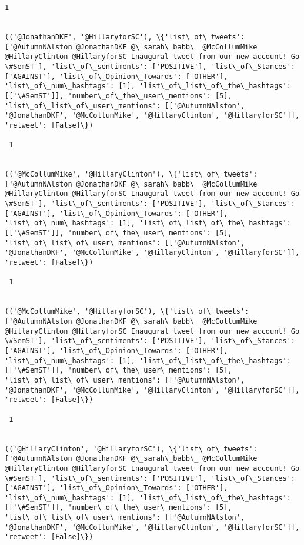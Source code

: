 \documentclass[11pt]{article}
\begin{document}
\begin{Verbatim}[commandchars=\\\{\}]
 1
 

(('@JonathanDKF', '@HillaryforSC'), \{'list\_of\_tweets': ['@AutumnNAlston @JonathanDKF @\_sarah\_babb\_ @McCollumMike @HillaryClinton @HillaryforSC Inaugural tweet from our new account! Go \#SemST'], 'list\_of\_sentiments': ['POSITIVE'], 'list\_of\_Stances': ['AGAINST'], 'list\_of\_Opinion\_Towards': ['OTHER'], 'list\_of\_num\_hashtags': [1], 'list\_of\_list\_of\_the\_hashtags': [['\#SemST']], 'number\_of\_the\_user\_mentions': [5], 'list\_of\_list\_of\_user\_mentions': [['@AutumnNAlston', '@JonathanDKF', '@McCollumMike', '@HillaryClinton', '@HillaryforSC']], 'retweet': [False]\})

 1
 

(('@McCollumMike', '@HillaryClinton'), \{'list\_of\_tweets': ['@AutumnNAlston @JonathanDKF @\_sarah\_babb\_ @McCollumMike @HillaryClinton @HillaryforSC Inaugural tweet from our new account! Go \#SemST'], 'list\_of\_sentiments': ['POSITIVE'], 'list\_of\_Stances': ['AGAINST'], 'list\_of\_Opinion\_Towards': ['OTHER'], 'list\_of\_num\_hashtags': [1], 'list\_of\_list\_of\_the\_hashtags': [['\#SemST']], 'number\_of\_the\_user\_mentions': [5], 'list\_of\_list\_of\_user\_mentions': [['@AutumnNAlston', '@JonathanDKF', '@McCollumMike', '@HillaryClinton', '@HillaryforSC']], 'retweet': [False]\})

 1
 

(('@McCollumMike', '@HillaryforSC'), \{'list\_of\_tweets': ['@AutumnNAlston @JonathanDKF @\_sarah\_babb\_ @McCollumMike @HillaryClinton @HillaryforSC Inaugural tweet from our new account! Go \#SemST'], 'list\_of\_sentiments': ['POSITIVE'], 'list\_of\_Stances': ['AGAINST'], 'list\_of\_Opinion\_Towards': ['OTHER'], 'list\_of\_num\_hashtags': [1], 'list\_of\_list\_of\_the\_hashtags': [['\#SemST']], 'number\_of\_the\_user\_mentions': [5], 'list\_of\_list\_of\_user\_mentions': [['@AutumnNAlston', '@JonathanDKF', '@McCollumMike', '@HillaryClinton', '@HillaryforSC']], 'retweet': [False]\})

 1
 

(('@HillaryClinton', '@HillaryforSC'), \{'list\_of\_tweets': ['@AutumnNAlston @JonathanDKF @\_sarah\_babb\_ @McCollumMike @HillaryClinton @HillaryforSC Inaugural tweet from our new account! Go \#SemST'], 'list\_of\_sentiments': ['POSITIVE'], 'list\_of\_Stances': ['AGAINST'], 'list\_of\_Opinion\_Towards': ['OTHER'], 'list\_of\_num\_hashtags': [1], 'list\_of\_list\_of\_the\_hashtags': [['\#SemST']], 'number\_of\_the\_user\_mentions': [5], 'list\_of\_list\_of\_user\_mentions': [['@AutumnNAlston', '@JonathanDKF', '@McCollumMike', '@HillaryClinton', '@HillaryforSC']], 'retweet': [False]\})


\end{Verbatim}
\end{document}
